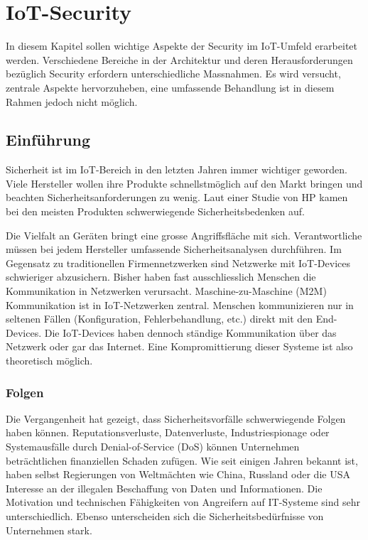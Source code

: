 \chapter{IoT-Security}
In diesem Kapitel sollen wichtige Aspekte der Security im IoT-Umfeld erarbeitet werden. Verschiedene Bereiche in der Architektur und deren Herausforderungen bezüglich Security erfordern unterschiedliche Massnahmen. Es wird versucht, zentrale Aspekte hervorzuheben, eine umfassende Behandlung ist in diesem Rahmen jedoch nicht möglich.
\section{Einführung}
Sicherheit ist im IoT-Bereich in den letzten Jahren immer wichtiger geworden. Viele Hersteller wollen ihre Produkte schnellstmöglich auf den Markt bringen und beachten Sicherheitsanforderungen zu wenig. Laut einer Studie von HP kamen bei den meisten Produkten schwerwiegende Sicherheitsbedenken auf.\cite{SecOverview} 

Die Vielfalt an Geräten bringt eine grosse Angriffsfläche mit sich. Verantwortliche müssen bei jedem Hersteller umfassende Sicherheitsanalysen durchführen. Im Gegensatz zu traditionellen Firmennetzwerken sind Netzwerke mit IoT-Devices schwieriger abzusichern. Bisher haben fast ausschliesslich Menschen die Kommunikation in Netzwerken verursacht. Maschine-zu-Maschine (M2M) Kommunikation ist in IoT-Netzwerken zentral. Menschen kommunizieren nur in seltenen Fällen (Konfiguration, Fehlerbehandlung, etc.) direkt mit den End-Devices. Die IoT-Devices haben dennoch ständige Kommunikation über das Netzwerk oder gar das Internet. Eine Kompromittierung dieser Systeme ist also theoretisch möglich.

\subsection{Folgen}
Die Vergangenheit hat gezeigt, dass Sicherheitsvorfälle schwerwiegende Folgen haben können. Reputationsverluste, Datenverluste, Industriespionage oder Systemausfälle durch Denial-of-Service (DoS) können Unternehmen beträchtlichen finanziellen Schaden zufügen. Wie seit einigen Jahren bekannt ist, haben selbst Regierungen von Weltmächten wie China, Russland oder die USA Interesse an der illegalen Beschaffung von Daten und Informationen. Die Motivation und technischen Fähigkeiten von Angreifern auf IT-Systeme sind sehr unterschiedlich. Ebenso unterscheiden sich die Sicherheitsbedürfnisse von Unternehmen stark.

